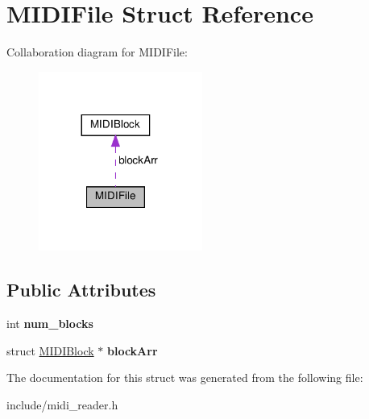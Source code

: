 \hypertarget{structMIDIFile}{}\section{M\+I\+D\+I\+File Struct Reference}
\label{structMIDIFile}


Collaboration diagram for M\+I\+D\+I\+File\+:\nopagebreak
\begin{figure}[H]
\begin{center}
\leavevmode
\includegraphics[width=152pt]{structMIDIFile__coll__graph}
\end{center}
\end{figure}
\subsection*{Public Attributes}
\begin{DoxyCompactItemize}
\item 
\mbox{\label{structMIDIFile_a309fa9832f1d4467ae97fdfe2e3c1e8a}} 
int {\bfseries num\+\_\+blocks}
\item 
\mbox{\label{structMIDIFile_ad24509ca8b3a778bb669de20c7792fbc}} 
struct \hyperlink{structMIDIBlock}{M\+I\+D\+I\+Block} $\ast$ {\bfseries block\+Arr}
\end{DoxyCompactItemize}


The documentation for this struct was generated from the following file\+:\begin{DoxyCompactItemize}
\item 
include/midi\+\_\+reader.\+h\end{DoxyCompactItemize}
